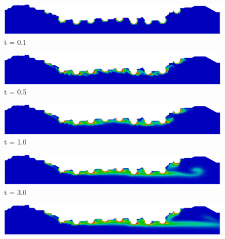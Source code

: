 \begin{figure}[H]
     \begin{minipage}{.50\linewidth}
      \centering
      \includegraphics[scale=0.18]{./02_chaps/cap_solution/figure/conc1000_RealStrut1.png}\\
      t = 0.1
     \end{minipage}%
     \begin{minipage}{.50\linewidth}
      \centering
      \includegraphics[scale=0.18]{./02_chaps/cap_solution/figure/conc1000_RealStrut2.png}\\
      t = 0.5
     \end{minipage}
     \begin{minipage}{.50\linewidth}
     \medskip
      \centering
      \includegraphics[scale=0.18]{./02_chaps/cap_solution/figure/conc1000_RealStrut3.png}\\
      t = 1.0
     \end{minipage}%
     \begin{minipage}{.50\linewidth}
     \medskip
      \centering
      \includegraphics[scale=0.18]{./02_chaps/cap_solution/figure/conc1000_RealStrut4.png}\\
      t = 3.0
     \end{minipage}
     \begin{minipage}{.50\linewidth}
      \centering
      \includegraphics[scale=0.18]{./02_chaps/cap_solution/figure/conc1000_RealStrut5.png}\\

\end{minipage}
\end{figure}
